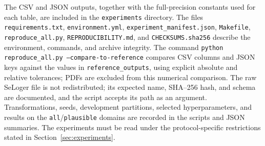 \documentclass[10pt,a4paper]{article}
\begin{document}
The CSV and JSON outputs, together with the full-precision constants used for each table, are included in the \texttt{experiments} directory. The files \texttt{requirements.txt}, \texttt{environment.yml}, \texttt{experiment\_manifest.json}, \texttt{Makefile}, \texttt{reproduce\_all.py}, \texttt{REPRODUCIBILITY.md}, and \texttt{CHECKSUMS.sha256} describe the environment, commands, and archive integrity. The command \texttt{python reproduce\_all.py --compare-to-reference} compares CSV columns and JSON keys against the values in \texttt{reference\_outputs}, using explicit absolute and relative tolerances; PDFs are excluded from this numerical comparison. The raw SeLoger file is not redistributed; its expected name, SHA--256 hash, and schema are documented, and the script accepts its path as an argument. Transformations, seeds, development partitions, selected hyperparameters, and results on the \texttt{all}/\texttt{plausible} domains are recorded in the scripts and JSON summaries. The experiments must be read under the protocol-specific restrictions stated in Section~\ref{sec:experiments}.

\renewcommand{\refname}{References}


\end{document}
